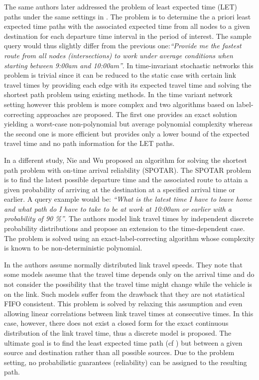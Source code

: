 The same authors later addressed the problem of least expected
time (LET) paths under the same settings in \cite{Miller-Hooks00}. The problem is to
determine the a priori least expected time paths with the associated expected time from all nodes to
a given destination for each departure time interval
in the period of interest. The sample query would thus slightly differ from the
previous one:\textit{``Provide me the fastest route from all nodes
(intersections) to work under average conditions when starting between 9:00am
and 10:00am''}. In time-invariant stochastic networks this
problem is trivial since it can be reduced to the static case with certain link
travel times by providing each edge with its expected travel time and solving
the shortest path problem using existing methods. In the time variant network
setting however this problem is more complex and two algorithms based on
label-correcting approaches are proposed. The first one provides an exact
solution yielding a worst-case non-polynomial but average polynomial complexity
whereas the second one is more efficient but provides only a lower bound of the
expected travel time and no path information for the LET paths.

In a different study, Nie and Wu \cite{Nie09b} proposed an algorithm for
solving the shortest path problem with on-time arrival reliability (SPOTAR). The SPOTAR problem is to
find the latest possible departure time and the associated route to attain a
given probability of arriving at the destination at a specified arrival time or
earlier. A query example would be: \textit{``What is the latest time I have to
leave home and what path do I have to take to be at work at 10:00am or earlier
with a probability of 90 \%''}. The authors model link travel times by independent
discrete probability distributions and propose an extension to the time-dependent case.
The problem is solved using an exact-label-correcting algorithm whose complexity
is known to be non-deterministic polynomial.

In \cite{Bi-Yu13} the authors assume normally distributed link
travel speeds. They note that some models assume that the travel time depends only
on the arrival time and do not consider the possibility that the travel time might change while the vehicle is on the link. Such models suffer from the drawback that they are not
statistical FIFO consistent. This problem is solved by relaxing this assumption and even allowing
linear correlations between link travel times at consecutive times. In this
case, however, there does not exist a closed form for the exact continuous
distribution of the link travel time, thus a discrete model is proposed. The
ultimate goal is to find the least expected time path (cf \cite{Miller-Hooks00})
but between a given source and destination rather than all possible sources. Due
to the problem setting, no probabilistic guarantees (reliability) can be assigned to the resulting path.


